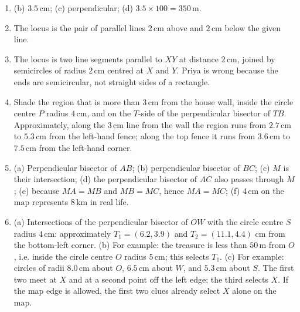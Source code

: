 \documentclass[12pt,a4paper]{article}
\begin{document}
\begin{enumerate}[label=\textbf{Q\arabic*.}, leftmargin=*, itemsep=4pt, topsep=4pt]
\item (b) \(3.5\,\text{cm}\); (c) perpendicular; (d) \(3.5\times100=350\,\text{m}\).

\item The locus is the pair of parallel lines \(2\,\text{cm}\) above and \(2\,\text{cm}\) below the given line.

\item The locus is two line segments parallel to \(XY\) at distance \(2\,\text{cm}\), joined by semicircles of radius \(2\,\text{cm}\) centred at \(X\) and \(Y\). Priya is wrong because the ends are semicircular, not straight sides of a rectangle.

\item Shade the region that is more than \(3\,\text{cm}\) from the house wall, inside the circle centre \(P\) radius \(4\,\text{cm}\), and on the \(T\)-side of the perpendicular bisector of \(TB\). Approximately, along the \(3\,\text{cm}\) line from the wall the region runs from \(2.7\,\text{cm}\) to \(5.3\,\text{cm}\) from the left-hand fence; along the top fence it runs from \(3.6\,\text{cm}\) to \(7.5\,\text{cm}\) from the left-hand corner.

\item (a) Perpendicular bisector of \(AB\); (b) perpendicular bisector of \(BC\); (c) \(M\) is their intersection; (d) the perpendicular bisector of \(AC\) also passes through \(M\); (e) because \(MA=MB\) and \(MB=MC\), hence \(MA=MC\); (f) \(4\,\text{cm}\) on the map represents \(8\,\text{km}\) in real life.

\item (a) Intersections of the perpendicular bisector of \(OW\) with the circle centre \(S\) radius \(4\,\text{cm}\): approximately \(T_1=(6.2,3.9)\) and \(T_2=(11.1,4.4)\) cm from the bottom-left corner. (b) For example: the treasure is less than \(50\,\text{m}\) from \(O\), i.e. inside the circle centre \(O\) radius \(5\,\text{cm}\); this selects \(T_1\). (c) For example: circles of radii \(8.0\,\text{cm}\) about \(O\), \(6.5\,\text{cm}\) about \(W\), and \(5.3\,\text{cm}\) about \(S\). The first two meet at \(X\) and at a second point off the left edge; the third selects \(X\). If the map edge is allowed, the first two clues already select \(X\) alone on the map.

\end{enumerate}
\end{document}
